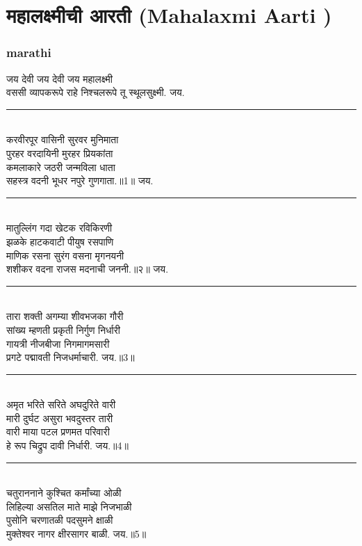 \documentclass[letterpaper,twocolumn,openany,nodeprecatedcode]{dndbook}
\begin{document}
\chapter{महालक्ष्मीची आरती (Mahalaxmi Aarti )}
\begin{flushleft}
  \subsection*{marathi}
  जय देवी जय देवी जय महालक्ष्मी \\
  वससी व्यापकरूपे राहे निश्चलरूपे तू स्थूलसुक्ष्मी. जय. \\
  \rule{\linewidth}{1pt} \\
  करवीरपूर वासिनी सुरवर मुनिमाता \\
  पुरहर वरदायिनी मुरहर प्रियकांता \\
  कमलाकारे जठरी जन्मविला धाता \\
  सहस्त्र वदनी भूधर नपुरे गुणगाता.॥1॥ जय. \\
  \rule{\linewidth}{1pt} \\
  मातुल्लिंग गदा खेटक रविकिरणी \\
  झळके हाटकवाटी पीयुष रसपाणि \\
  माणिक रसना सुरंग वसना मृगनयनी \\
  शशीकर वदना राजस मदनाची जननी.॥२॥ जय. \\
  \rule{\linewidth}{1pt} \\
  तारा शक्ती अगम्या शीवभजका गौरी \\
  सांख्य म्हणती प्रकृती निर्गुण निर्धारी \\
  गायत्री नीजबीजा निगमागमसारी \\
  प्रगटे पद्मावती निजधर्माचारी. जय.॥3॥ \\
  \rule{\linewidth}{1pt} \\
  अमृत भरिते सरिते अघदुरिते वारी \\
  मारी दुर्घट असुरा भवदुस्तर तारी \\
  वारी माया पटल प्रणमत परिवारी \\
  हे रूप चिद्रुप दावी निर्धारी. जय.॥4॥ \\
  \rule{\linewidth}{1pt} \\
  चतुराननाने कुश्चित कर्मांच्या ओळी \\
  लिहिल्या असतिल माते माझे निजभाळी \\
  पुसोनि चरणातळी पदसुमने क्षाळी \\
  मुक्तेश्वर नागर क्षीरसागर बाळी. जय.॥5॥ \\
  \pagebreak

\end{flushleft}
\end{document}
